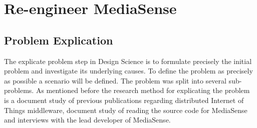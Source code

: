 \chapter{Re-engineer MediaSense}
\section{Problem Explication}
The explicate problem step in Design Science \cite{johannesson2012design} is to formulate precisely the initial problem and investigate its underlying causes. To define the problem as precisely as possible a scenario will be defined. The problem was split into several sub-problems. As mentioned before the research method for explicating the problem is a document study of previous publications regarding distributed Internet of Things middleware, document study of reading the source code for MediaSense and interviews with the lead developer of MediaSense. 

%
%

